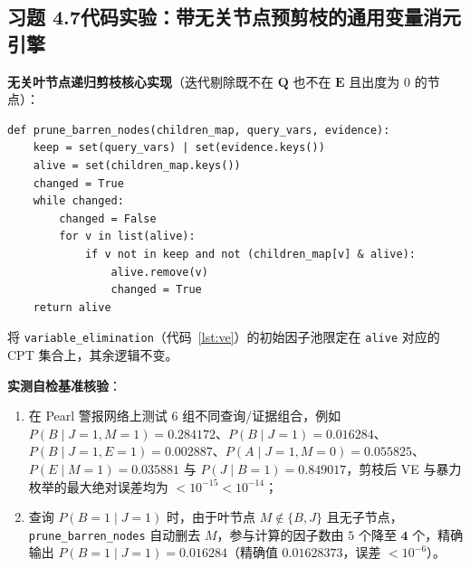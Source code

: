 \subsection*{习题 4.7\quad 代码实验：带无关节点预剪枝的通用变量消元引擎}
\textbf{无关叶节点递归剪枝核心实现}（迭代剔除既不在 $\mathbf{Q}$ 也不在 $\mathbf{E}$ 且出度为 $0$ 的节点）：
\begin{lstlisting}
def prune_barren_nodes(children_map, query_vars, evidence):
    keep = set(query_vars) | set(evidence.keys())
    alive = set(children_map.keys())
    changed = True
    while changed:
        changed = False
        for v in list(alive):
            if v not in keep and not (children_map[v] & alive):
                alive.remove(v)
                changed = True
    return alive
\end{lstlisting}
将 \texttt{variable\_elimination}（代码~\ref{lst:ve}）的初始因子池限定在 \texttt{alive} 对应的 CPT 集合上，其余逻辑不变。

\textbf{实测自检基准核验}：
\begin{enumerate}[label=(\arabic*), leftmargin=1.8em]
  \item 在 Pearl 警报网络上测试 6 组不同查询/证据组合，例如 $P(B\mid J=1, M=1)=0.284172$、$P(B\mid J=1)=0.016284$、$P(B\mid J=1, E=1)=0.002887$、$P(A\mid J=1, M=0)=0.055825$、$P(E\mid M=1)=0.035881$ 与 $P(J\mid B=1)=0.849017$，剪枝后 VE 与暴力枚举的最大绝对误差均为 $< 10^{-15} < 10^{-14}$；
  \item 查询 $P(B=1 \mid J=1)$ 时，由于叶节点 $M \notin \{B, J\}$ 且无子节点，\texttt{prune\_barren\_nodes} 自动删去 $M$，参与计算的因子数由 $5$ 个降至 $\mathbf{4}$ 个，精确输出 $P(B=1\mid J=1) = \mathbf{0.016284}$（精确值 $0.01628373$，误差 $< 10^{-6}$）。
\end{enumerate}

